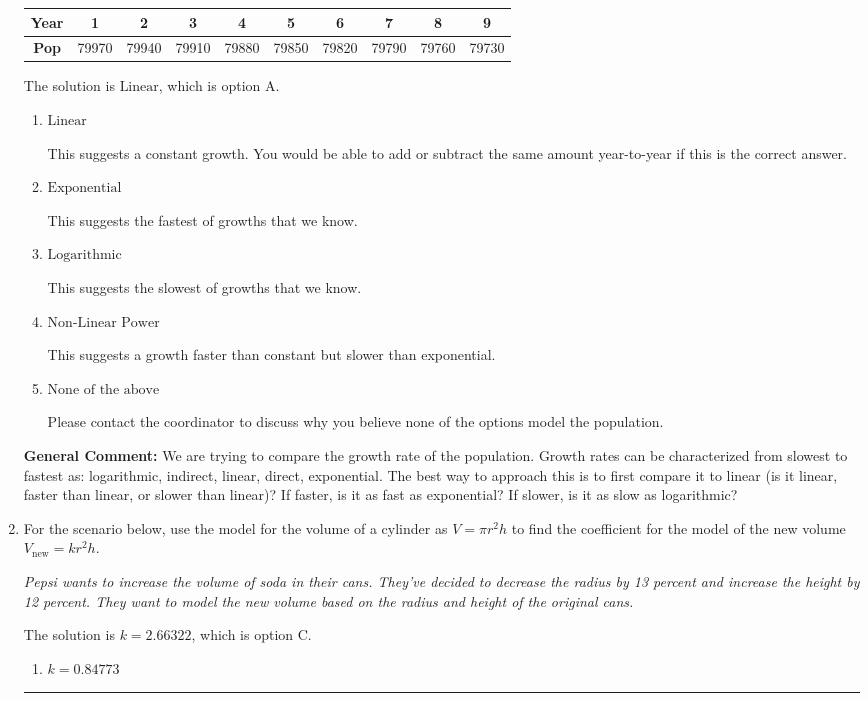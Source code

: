 \documentclass{extbook}[14pt]
\newcommand{\litem}[1]{\item #1

\rule{\textwidth}{0.4pt}}
\begin{document}
\begin{enumerate}
{\begin{tabular}{c|c|c|c|c|c|c|c|c|c}
\textbf{Year} &1 &2 &3 &4 &5 &6 &7 &8 &9\tabularnewline \hline
\textbf{Pop} &79970 &79940 &79910 &79880 &79850 &79820 &79790 &79760 &79730\end{tabular}The solution is \( \text{Linear} \), which is option A.\begin{enumerate}[label=\Alph*.]
\item \( \text{Linear} \)

This suggests a constant growth. You would be able to add or subtract the same amount year-to-year if this is the correct answer.
\item \( \text{Exponential} \)

This suggests the fastest of growths that we know.
\item \( \text{Logarithmic} \)

This suggests the slowest of growths that we know.
\item \( \text{Non-Linear Power} \)

This suggests a growth faster than constant but slower than exponential.
\item \( \text{None of the above} \)

Please contact the coordinator to discuss why you believe none of the options model the population.
\end{enumerate}

\textbf{General Comment:} We are trying to compare the growth rate of the population. Growth rates can be characterized from slowest to fastest as: logarithmic, indirect, linear, direct, exponential. The best way to approach this is to first compare it to linear (is it linear, faster than linear, or slower than linear)? If faster, is it as fast as exponential? If slower, is it as slow as logarithmic?
}
\litem{
For the scenario below, use the model for the volume of a cylinder as $V = \pi r^2 h$ to find the coefficient for the model of the new volume $V_{\text{new}} = k r^2 h$.

\begin{center}
    \textit{ Pepsi wants to increase the volume of soda in their cans. They've decided to decrease the radius by 13 percent and increase the height by 12 percent. They want to model the new volume based on the radius and height of the original cans. }
\end{center}
The solution is \( k = 2.66322 \), which is option C.\begin{enumerate}[label=\Alph*.]
\item \( k = 0.84773 \)


\end{enumerate}}
\end{enumerate}
\end{document}
